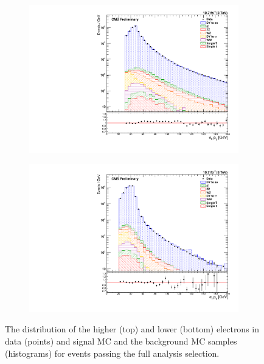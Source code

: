 \begin{figure}[!htbp]
    \centering
    \begin{subfigure}[b]{0.65\textwidth}
        \includegraphics[width=\textwidth]{figures/e0_pt.pdf}
    \end{subfigure}
    \begin{subfigure}[b]{0.65\textwidth}
        \includegraphics[width=\textwidth]{figures/e1_pt.pdf}
    \end{subfigure}
    \caption[
        The \pt distribution of electrons in data.
    ]{
        The \pt distribution of the higher (top) and lower (bottom) \pt
        electrons in data (points) and \MADGRAPH signal MC and the background
        MC samples (histograms) for events passing the full analysis selection.
    }
    \label{fig:e_pt}
\end{figure}

